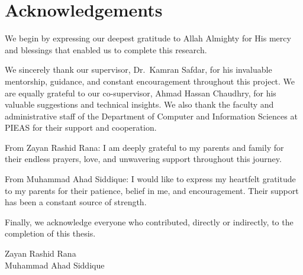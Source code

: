 \chapter*{Acknowledgements}
We begin by expressing our deepest gratitude to Allah Almighty for His mercy and blessings that enabled us to complete this research.

We sincerely thank our supervisor, Dr.\ Kamran Safdar, for his invaluable mentorship, guidance, and constant encouragement throughout this project. We are equally grateful to our co-supervisor, Ahmad Hassan Chaudhry, for his valuable suggestions and technical insights. We also thank the faculty and administrative staff of the Department of Computer and Information Sciences at PIEAS for their support and cooperation.

From Zayan Rashid Rana: I am deeply grateful to my parents and family for their endless prayers, love, and unwavering support throughout this journey.

From Muhammad Ahad Siddique: I would like to express my heartfelt gratitude to my parents for their patience, belief in me, and encouragement. Their support has been a constant source of strength.

Finally, we acknowledge everyone who contributed, directly or indirectly, to the completion of this thesis.

\vspace{0.5cm}
\noindent Zayan Rashid Rana\\
\noindent Muhammad Ahad Siddique

\clearpage
